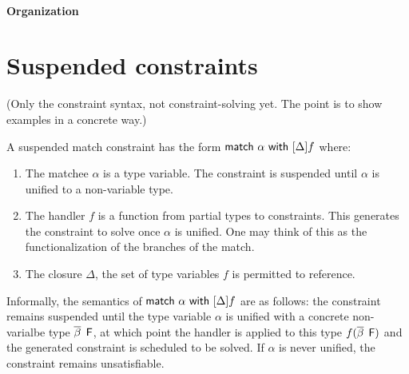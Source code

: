 \documentclass[acmsmall,screen,nonacm]{acmart}
\begin{document}



\paragraph{Organization} 

\section{Suspended constraints}


(Only the constraint syntax, not constraint-solving yet. The point is to
show examples in a concrete way.)

A suspended match constraint has the form $\mathsf{match} ~ \alpha ~ \mathsf{with} ~ [ \Delta ] f$ where:
\begin{enumerate}
\item
  The matchee $\alpha$ is a type variable. The constraint is suspended until
  $\alpha$ is unified to a non-variable type.
\item
  The handler $f$ is a function from partial types to constraints.
  This
  generates the constraint to solve once $\alpha$ is unified. One may think
  of this as the functionalization of the branches of the match.
\item
  The closure $\Delta$, the set of type variables $f$ is permitted to
  reference.
\end{enumerate}

Informally, the semantics of $\mathsf{match} ~ \alpha ~ \mathsf{with} ~ [ \Delta ] f$ are as follows: the
constraint remains suspended until the type variable $\alpha$ is unified
with a concrete non-varialbe type $\overline{\beta} \mathop{}\mathrel{\mathsf{F}}$, at which point
the handler is applied to this type $f(\overline{\beta} \mathop{}\mathrel{\mathsf{F}})$ and the
generated constraint is scheduled to be solved. If $\alpha$ is never
unified, the constraint remains unsatisfiable.
\end{document}
